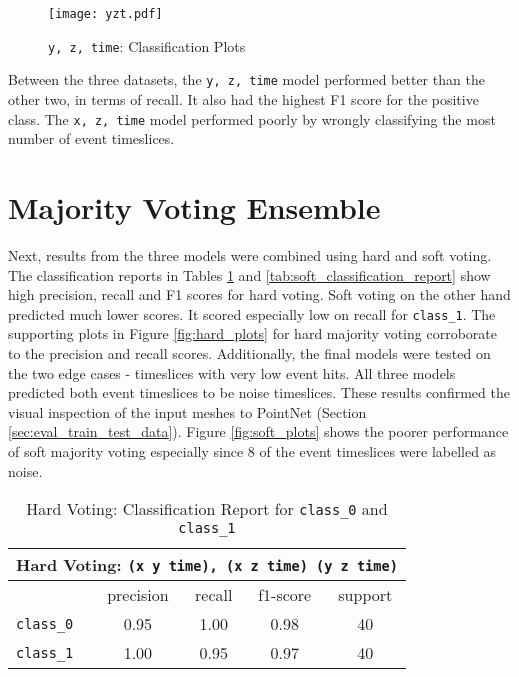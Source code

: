 \begin{figure}[ht!]
    \centering
    \texttt{[image: yzt.pdf]}
    \caption{\texttt{y, z, time}: Classification Plots}
    \label{fig:yzt_results}
\end{figure}

Between the three datasets, the \texttt{y, z, time} model performed better than the other two, in terms of recall. It also had the highest F1 score for the positive class. The  \texttt{x, z, time} model performed poorly by wrongly classifying the most number of event timeslices. 


\section{Majority Voting Ensemble}
Next, results from the three models were combined using hard and soft voting. The classification reports in Tables \ref{tab:hard_classification_report} and  \ref{tab:soft_classification_report} show high precision, recall and F1 scores for hard voting. Soft voting on the other hand predicted much lower scores. It scored especially low on recall for \texttt{class\_1}.  The supporting plots in Figure \ref{fig:hard_plots} for hard majority voting corroborate to the precision and recall scores. Additionally, the final models were tested on the two edge cases - timeslices with very low event hits. All three models predicted both event timeslices to be noise timeslices. These results confirmed the visual inspection of the input meshes to PointNet (Section \ref{sec:eval_train_test_data}). Figure \ref{fig:soft_plots} shows the poorer performance of soft majority voting especially since 8 of the event timeslices were labelled as noise.

\begin{table} [ht!]
    \centering
    \begin{tabular}{l c c c c}
    \hline
    \multicolumn{5}{c}{Hard Voting: \texttt{(x y time), (x z time) (y z time)}} \\
    \hline
                          & precision & recall & f1-score & support \\
        \texttt{class\_0} & 0.95      &  1.00  & 0.98     & 40\\
        \texttt{class\_1} & 1.00 &    0.95     & 0.97     & 40\\
    \hline
    \end{tabular}
    \caption{Hard Voting: Classification Report for \texttt{class\_0} and \texttt{class\_1}}
    \label{tab:hard_classification_report}
\end{table}


